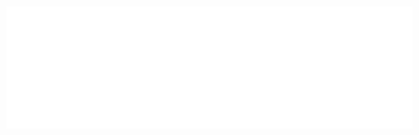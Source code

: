 \begin{multicols}{2}
\noindent\includegraphics[width=\columnwidth, height=6in]{testblock.pdf}

\end{multicols}

\pagebreak

